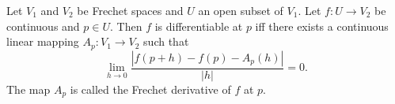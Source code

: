Let $V_1$ and $V_2$ be Frechet spaces and $U$ an open subset of $V_1$. Let $f: U \to V_2$ be continuous and $p \in U$. Then $f$ is differentiable at $p$ iff there exists a continuous linear mapping $A_p: V_1 \to V_2$ such that
$$\lim_{h \to 0} \frac{|f(p+h) - f(p) - A_p(h)|}{|h|} = 0.$$
The map $A_p$ is called the Frechet derivative of $f$ at $p$.
